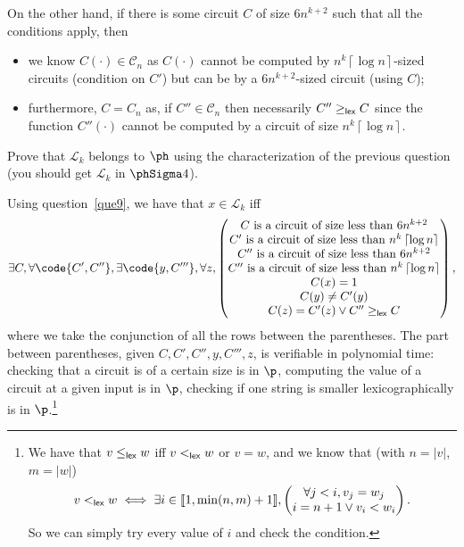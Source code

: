 \documentclass[fontsize=16pt,a4paper,DIV=17,parskip=half]{scrartcl}
\renewcommand{\mathsf}[1]{\text{\normalfont\sffamily#1}}
\theoremstyle{definition}
\begin{document}
  On the other hand, if there is some circuit $C$ of size $6n^{k+2}$ such that all the conditions apply, then
  \begin{itemize}
    \item we know $C(\cdot ) \in \mathcal{C}_n$ as $C(\cdot)$ cannot be computed by $n^k \left\lceil \log n \right\rceil$-sized circuits (condition on $C'$) but can be by a $6n^{k+2}$-sized circuit (using $C$);
    \item furthermore, $C = C_n$ as, if $C'' \in \mathcal{C}_n$ then necessarily $C'' \ge_\mathsf{lex} C$ since the function $C''(\cdot)$ cannot be computed by a circuit of size $n^k \left\lceil \log n \right\rceil$.
  \end{itemize}

  \begin{que}
    Prove that $\mathcal{L}_k$ belongs to $\ph$ using the characterization of the previous question (you should get $\mathcal{L}_k$ in $\phSigma 4$).
    \label{que10}
  \end{que}

  Using question~\ref{que9}, we have that $x \in \mathcal{L}_k$ iff
  \[
    \exists C, \forall \code{C', C''}, \exists \code{y, C'''}, \forall z,
    \begin{pmatrix} 
      \text{$C$ is a circuit of size less than $6 n^{k+2}$}\\
      \text{$C'$ is a circuit of size less than $n^k \left\lceil \log n \right\rceil $}\\
      \text{$C''$ is a circuit of size less than $6 n^{k+2}$}\\
      \text{$C''$ is a circuit of size less than $n^k \left\lceil \log n \right\rceil $}\\
      C(x) = 1\\
      C(y) \neq C'(y)\\
      C(z) = C'(z) \vee C'' \ge_\mathsf{lex} C \\
    \end{pmatrix} 
  ,\] 
  where we take the conjunction of all the rows between the parentheses.
  The part between parentheses, given $C, C', C'', y, C''', z$, is verifiable in polynomial time: checking that a circuit is of a certain size is in $\p$, computing the value of a circuit at a given input is in $\p$, checking if one string is smaller lexicographically is in $\p$.\footnote{
    We have that $v \le_\mathsf{lex} w$ iff $v <_\mathsf{lex} w$ or $v = w$, and we know that (with $n = |v|$,  $m = |w|$)
    \[
    v <_\mathsf{lex} w \iff \exists i \in \llbracket 1, \min(n,m) + 1\rrbracket, \begin{pmatrix} \forall j < i, v_j = w_j\\ i = n + 1 \vee v_i < w_i \end{pmatrix} 
    .\]
    So we can simply try every value of $i$ and check the condition.
  }
\end{document}
